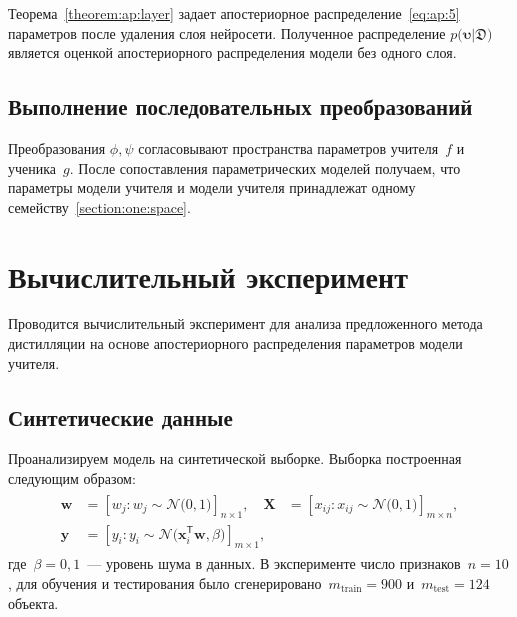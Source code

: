 \documentclass[12pt]{a&t}
\begin{document}
Теорема~\ref{theorem:ap:layer} задает апостериорное распределение~\eqref{eq:ap:5} параметров после удаления слоя нейросети. Полученное распределение $p\bigr(\bm{\upsilon}|\mathfrak{D}\bigr) $ является оценкой апостериорного распределения модели без одного слоя.

\subsection{Выполнение последовательных преобразований}
Преобразования $\phi, \psi$ согласовывают пространства параметров учителя~$f$ и ученика~$g$. После сопоставления параметрических моделей получаем, что параметры модели учителя и модели учителя принадлежат одному семейству~\ref{section:one:space}.

\section{Вычислительный эксперимент}
Проводится вычислительный эксперимент для анализа предложенного метода дистилляции на основе апостериорного распределения параметров модели учителя.

\subsection{Синтетические данные}
Проанализируем модель на синтетической выборке. Выборка построенная следующим образом:
\begin{gather}
\label{eq:ex:1}
\begin{aligned}
\mathbf{w} &= \left[w_j: w_{j}\sim \mathcal{N}\bigr(0, 1\bigr)\right]_{n\times 1}, \quad \mathbf{X} &= \left[x_{ij}: x_{ij}\sim\mathcal{N}\bigr(0, 1\bigr)\right]_{m\times n}, \\
 \mathbf{y} &= \left[y_i: y_i \sim \mathcal{N}\bigr(\mathbf{x}_i^{\mathsf{T}}\mathbf{w}, \beta\bigr)\right]_{m \times 1},
\end{aligned}
\end{gather} 
где~$\beta=0{,}1$~--- уровень шума в данных. В эксперименте число признаков~$n=10$, для обучения и тестирования было сгенерировано~$m_{\text{train}}=900$ и~$m_{\text{test}}=124$ объекта.
\end{document}
